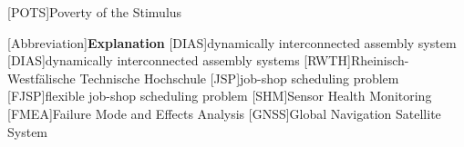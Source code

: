 \usepackage{acronym}[POTS]{Poverty of the Stimulus}


\begin{acronym}[Abbreviation]
 [Abbreviation]{\textbf{Explanation}} 
 [DIAS]{dynamically interconnected assembly system}
 [DIAS]{dynamically interconnected assembly systems}
 [RWTH]{Rheinisch-Westfälische Technische Hochschule}
 [JSP]{job-shop scheduling problem}
 [FJSP]{flexible job-shop scheduling problem}
 [SHM]{Sensor Health Monitoring}
 [FMEA]{Failure Mode and Effects Analysis}
  [GNSS]{Global Navigation Satellite System}
\end{acronym}

